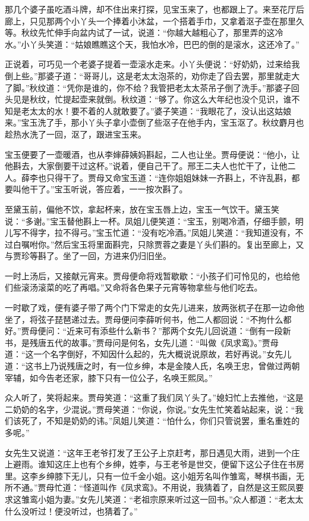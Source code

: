 那几个婆子虽吃酒斗牌，却不住出来打探，见宝玉来了，也都跟上了。来至花厅后廊上，只见那两个小丫头一个捧着小沐盆，一个搭着手巾，又拿着沤子壶在那里久等。秋纹先忙伸手向盆内试了一试，说道：“你越大越粗心了，那里弄的这冷水。”小丫头笑道：“姑娘瞧瞧这个天，我怕水冷，巴巴的倒的是滚水，这还冷了。”

正说着，可巧见一个老婆子提着一壶滚水走来。小丫头便说：“好奶奶，过来给我倒上些。”那婆子道：“哥哥儿，这是老太太泡茶的，劝你走了舀去罢，那里就走大了脚。”秋纹道：“凭你是谁的，你不给？我管把老太太茶吊子倒了洗手。”那婆子回头见是秋纹，忙提起壶来就倒。秋纹道：“够了。你这么大年纪也没个见识，谁不知是老太太的水！要不着的人就敢要了。”婆子笑道：“我眼花了，没认出这姑娘来。”宝玉洗了手，那小丫头子拿小壶倒了些沤子在他手内，宝玉沤了。秋纹麝月也趁热水洗了一回，沤了，跟进宝玉来。

宝玉便要了一壶暖酒，也从李婶薛姨妈斟起，二人也让坐。贾母便说：“他小，让他斟去，大家倒要干过这杯。”说着，便自己干了。邢王二夫人也忙干了，让他二人。薛李也只得干了。贾母又命宝玉道：“连你姐姐妹妹一齐斟上，不许乱斟，都要叫他干了。”宝玉听说，答应着，一一按次斟了。

至黛玉前，偏他不饮，拿起杯来，放在宝玉唇上边，宝玉一气饮干。黛玉笑说：“多谢。”宝玉替他斟上一杯。凤姐儿便笑道：“宝玉，别喝冷酒，仔细手颤，明儿写不得字，拉不得弓。”宝玉忙道：“没有吃冷酒。”凤姐儿笑道：“我知道没有，不过白嘱咐你。”然后宝玉将里面斟完，只除贾蓉之妻是丫头们斟的。复出至廊上，又与贾珍等斟了。坐了一回，方进来仍归旧坐。

一时上汤后，又接献元宵来。贾母便命将戏暂歇歇：“小孩子们可怜见的，也给他们些滚汤滚菜的吃了再唱。”又命将各色果子元宵等物拿些与他们吃去。

一时歇了戏，便有婆子带了两个门下常走的女先儿进来，放两张杌子在那一边命他坐了，将弦子琵琶递过去。贾母便问李薛听何书，他二人都回说：“不拘什么都好。”贾母便问：“近来可有添些什么新书？”那两个女先儿回说道：“倒有一段新书，是残唐五代的故事。”贾母问是何名，女先儿道：“叫做《凤求鸾》。”贾母道：“这一个名字倒好，不知因什么起的，先大概说说原故，若好再说。”女先儿道：“这书上乃说残唐之时，有一位乡绅，本是金陵人氏，名唤王忠，曾做过两朝宰辅，如今告老还家，膝下只有一位公子，名唤王熙凤。”

众人听了，笑将起来。贾母笑道：“这重了我们凤丫头了。”媳妇忙上去推他，“这是二奶奶的名字，少混说。”贾母笑道：“你说，你说。”女先生忙笑着站起来，说：“我们该死了，不知是奶奶的讳。”凤姐儿笑道：“怕什么，你们只管说罢，重名重姓的多呢。”

女先生又说道：“这年王老爷打发了王公子上京赶考，那日遇见大雨，进到一个庄上避雨。谁知这庄上也有个乡绅，姓李，与王老爷是世交，便留下这公子住在书房里。这李乡绅膝下无儿，只有一位千金小姐。这小姐芳名叫作雏鸾，琴棋书画，无所不通。”贾母忙道：“怪道叫作《凤求鸾》。不用说，我猜着了，自然是这王熙凤要求这雏鸾小姐为妻。”女先儿笑道：“老祖宗原来听过这一回书。”众人都道：“老太太什么没听过！便没听过，也猜着了。”

